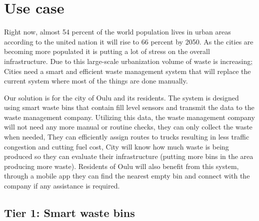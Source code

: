 \documentclass{article}
\begin{document}
\section{Use case}


Right now, almost 54 percent of the world population lives in urban areas according to the united nation it will rise to 66 percent by 2050. As the cities are becoming more populated it is putting a lot of stress on the overall infrastructure. Due to this large-scale urbanization volume of waste is increasing; Cities need a smart and efficient waste management system that will replace the current system where most of the things are done manually. 

Our solution is for the city of Oulu and its residents. The system is designed using smart waste bins that contain fill level sensors and transmit the data to the waste management company. Utilizing this data, the waste management company will not need any more manual or routine checks, they can only collect the waste when needed,  They can efficiently assign routes to trucks resulting in less traffic congestion and cutting fuel cost, City will know how much waste is being produced so they can evaluate their infrastructure (putting more bins in the area producing more waste). Residents of Oulu will also benefit from this system, through a mobile app they can find the nearest empty bin and connect with the company if any assistance is required.

\subsection{Tier 1: Smart waste bins}

\end{document}
